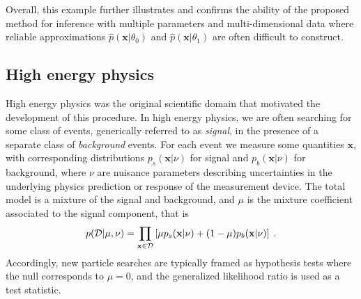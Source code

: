 \documentclass[12pt]{article}
\numberwithin{equation}{section}
\theoremstyle{plain}
\begin{document}
Overall, this example further illustrates and confirms the ability
of the proposed method for inference with multiple parameters and multi-dimensional data where
reliable approximations $\hat p(\mathbf{x}|\theta_0)$ and $\hat p(\mathbf{x}|\theta_1)$
are often difficult to construct.


\subsection{High energy physics}

High energy physics was the original scientific domain that motivated the development of this procedure.
In high energy physics, we are often searching for some class of events,
generically referred to as \textit{signal}, in the presence of a separate class
of \textit{background} events.  For each event we measure some quantities
$\mathbf{x}$, with corresponding distributions $p_s(\mathbf{x}|\nu)$ for signal
and $p_b(\mathbf{x}|\nu)$ for background,  where $\nu$ are nuisance
parameters describing uncertainties in the underlying physics prediction or
response of the measurement device. The total model is a mixture of the signal
and background, and $\mu$ is the mixture coefficient associated to the signal
component, that is
\begin{equation}\label{eq:hepGen}
p( {\cal D} | \mu, \nu) = \prod_{\mathbf{x} \in {\cal D}} \left[ \mu p_s( \mathbf{x} |  \nu)  + (1-\mu) p_b( \mathbf{x} | \nu) \right] \;.
\end{equation}
Accordingly, new particle searches are typically framed as
hypothesis tests where the null corresponds to $\mu=0$, and the generalized
likelihood ratio is used as a test statistic.

\end{document}
